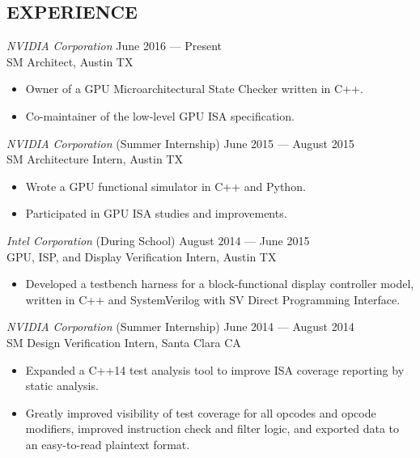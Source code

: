 \documentclass[margin]{res}
\begin{document}
\begin{resume}
  \section{EXPERIENCE}
  {\sl NVIDIA Corporation}
  \hfill June 2016 --- Present \\
  SM Architect, Austin TX
  \vspace{0.25em}
  \begin{itemize}
  \item Owner of a GPU Microarchitectural State Checker written in C++.
  \item Co-maintainer of the low-level GPU ISA specification.
  \end{itemize}
  \vspace{-.3em}
  {\sl NVIDIA Corporation}
  \hfill (Summer Internship) June 2015 --- August 2015 \\
  SM Architecture Intern, Austin TX
  \vspace{0.25em}
  \begin{itemize}
  \item Wrote a GPU functional simulator in C++ and Python.
  \item Participated in GPU ISA studies and improvements.
  \end{itemize}
  \vspace{-.5em}
  {\sl Intel Corporation}
  \hfill (During School) August 2014 --- June 2015 \\
  GPU, ISP, and Display Verification Intern, Austin TX
  \vspace{0.25em}
  \begin{itemize}
  \item Developed a testbench harness for a block-functional display controller
    model, written in C++ and SystemVerilog with SV Direct Programming
    Interface.
  \end{itemize}
  \vspace{-.5em}
  {\sl NVIDIA Corporation}
  \hfill (Summer Internship) June 2014 --- August 2014 \\
  SM Design Verification Intern, Santa Clara CA
  \vspace{0.25em}
  \begin{itemize}
  \item Expanded a C++14 test analysis tool to improve ISA coverage reporting
    by static analysis.
  \item Greatly improved visibility of test coverage for all opcodes and opcode
    modifiers, improved instruction check and filter logic, and exported data to
    an easy-to-read plaintext format.
  \end{itemize}

\end{resume}
\end{document}
